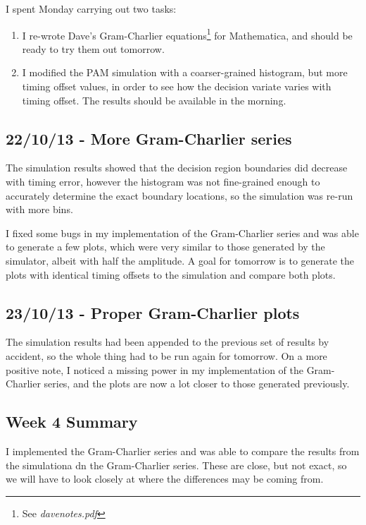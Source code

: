 I spent Monday carrying out two tasks:

\begin{enumerate}
\def\labelenumi{\arabic{enumi}.}
\itemsep1pt\parskip0pt
\item
  I re-wrote Dave's Gram-Charlier equations\footnote{See
    \emph{davenotes.pdf}} for Mathematica, and should be ready to try
  them out tomorrow.
\item
  I modified the PAM simulation with a coarser-grained histogram, but
  more timing offset values, in order to see how the decision variate
  varies with timing offset. The results should be available in the
  morning.
\end{enumerate}

\subsection{22/10/13 - More Gram-Charlier series}

The simulation results showed that the decision region boundaries did
decrease with timing error, however the histogram was not fine-grained
enough to accurately determine the exact boundary locations, so the
simulation was re-run with more bins.

I fixed some bugs in my implementation of the Gram-Charlier series and
was able to generate a few plots, which were very similar to those
generated by the simulator, albeit with half the amplitude. A goal for
tomorrow is to generate the plots with identical timing offsets to the
simulation and compare both plots.

\subsection{23/10/13 - Proper Gram-Charlier plots}

The simulation results had been appended to the previous set of results
by accident, so the whole thing had to be run again for tomorrow. On a
more positive note, I noticed a missing power in my implementation of
the Gram-Charlier series, and the plots are now a lot closer to those
generated previously.

\subsection{Week 4 Summary}

I implemented the Gram-Charlier series and was able to compare the
results from the simulationa dn the Gram-Charlier series. These are
close, but not exact, so we will have to look closely at where the
differences may be coming from.

